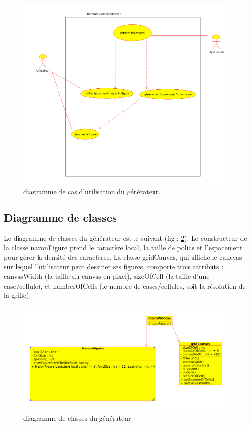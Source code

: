 \documentclass{article}
\begin{document}
\begin{figure}[!h]
	\centering
	\includegraphics[scale=0.35]{./images/diagramme_cas_utilisation.png}
	\caption{diagramme de cas d'utilisation du générateur.}
	\label{fig:utilisation}
\end{figure}

\newpage
\subsection{Diagramme de classes}
Le diagramme de classes du générateur est le suivant (fig : \ref{fig:classe_figure}). Le constructeur de la classe navonFigure prend le caractère local, la taille de police et l'espacement pour gérer la densité des caractères. La classe gridCanvas, qui affiche le canevas sur lequel l'utilisateur peut dessiner ses figures, comporte trois attributs : canvasWidth (la taille du canvas en pixel), sizeOfCell (la taille d'une case/cellule), et numberOfCells (le nombre de cases/cellules, soit la résolution de la grille).

\begin{figure}[!h]
	\centering
	\includegraphics[scale=0.25]{./images/diagramme_classe.png}
	\caption{diagramme de classes du générateur}
	\label{fig:classe_figure}
\end{figure}
\end{document}

